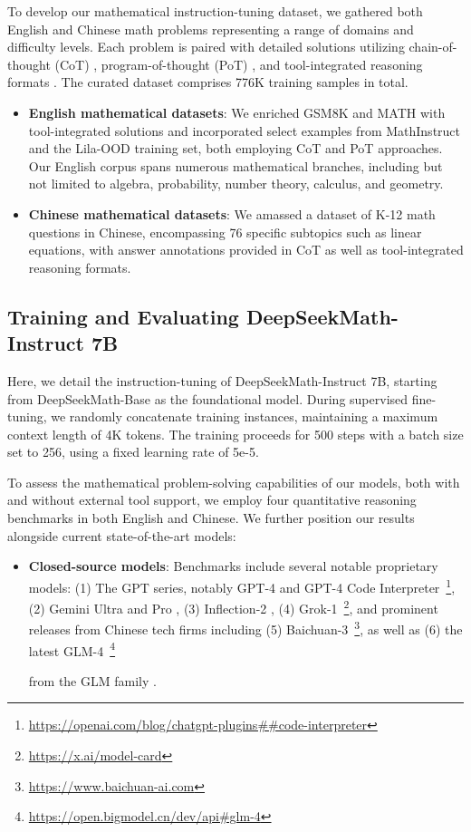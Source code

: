 To develop our mathematical instruction-tuning dataset, we gathered both English and Chinese math problems representing a range of domains and difficulty levels. Each problem is paired with detailed solutions utilizing chain-of-thought (CoT) \citep{cot}, program-of-thought (PoT) \citep{pot,pal}, and tool-integrated reasoning formats \citep{tora}. The curated dataset comprises 776K training samples in total.

\begin{itemize}[topsep=0pt]
    \item \textbf{English mathematical datasets}: We enriched GSM8K and MATH with tool-integrated solutions and incorporated select examples from MathInstruct \citep{MathInstruct} and the Lila-OOD \citep{lila} training set, both employing CoT and PoT approaches. Our English corpus spans numerous mathematical branches, including but not limited to algebra, probability, number theory, calculus, and geometry.
    \item \textbf{Chinese mathematical datasets}: We amassed a dataset of K-12 math questions in Chinese, encompassing 76 specific subtopics such as linear equations, with answer annotations provided in CoT as well as tool-integrated reasoning formats.
\end{itemize}

\subsection{Training and Evaluating DeepSeekMath-Instruct 7B}

Here, we detail the instruction-tuning of DeepSeekMath-Instruct 7B, starting from DeepSeekMath-Base as the foundational model. During supervised fine-tuning, we randomly concatenate training instances, maintaining a maximum context length of 4K tokens. The training proceeds for 500 steps with a batch size set to 256, using a fixed learning rate of 5e-5.

To assess the mathematical problem-solving capabilities of our models, both with and without external tool support, we employ four quantitative reasoning benchmarks in both English and Chinese. We further position our results alongside current state-of-the-art models:

\begin{itemize}[topsep=0pt]
    \item \textbf{Closed-source models}: Benchmarks include several notable proprietary models: (1) The GPT series, notably GPT-4 \citep{gpt4} and GPT-4 Code Interpreter~\footnote{\url{https://openai.com/blog/chatgpt-plugins\#\#code-interpreter}}, (2) Gemini Ultra and Pro \citep{gemini}, (3) Inflection-2 \citep{inflection-2}, (4) Grok-1~\footnote{\url{https://x.ai/model-card}}, and prominent releases from Chinese tech firms including (5) Baichuan-3~\footnote{\url{https://www.baichuan-ai.com}}, as well as (6) the latest GLM-4~\footnote{\url{https://open.bigmodel.cn/dev/api\#glm-4}}

    from the GLM family \citep{glm}.
\end{itemize}

